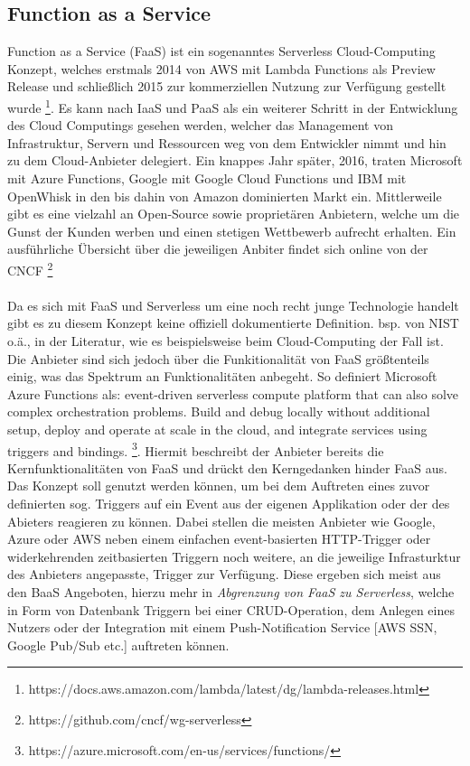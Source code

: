 \documentclass[11pt]{article}
\begin{document}
\subsection{Function as a Service}
Function as a Service (FaaS) ist ein sogenanntes \glqq Serverless\grqq{} Cloud-Computing Konzept, welches erstmals 2014 von AWS mit Lambda Functions als Preview Release und schließlich 2015 zur kommerziellen Nutzung zur Verfügung gestellt wurde \footnote{https://docs.aws.amazon.com/lambda/latest/dg/lambda-releases.html}. Es kann nach IaaS und PaaS als ein weiterer Schritt in der Entwicklung des Cloud Computings gesehen werden, welcher das Management von Infrastruktur, Servern und Ressourcen weg von dem Entwickler nimmt und hin zu dem Cloud-Anbieter delegiert. Ein knappes Jahr später, 2016, traten Microsoft mit Azure Functions, Google mit Google Cloud Functions und IBM mit OpenWhisk in den bis dahin von Amazon dominierten Markt ein. Mittlerweile gibt es eine vielzahl an Open-Source sowie proprietären Anbietern, welche um die Gunst der Kunden werben und einen stetigen Wettbewerb aufrecht erhalten. Ein ausführliche Übersicht über die jeweiligen Anbiter findet sich online von der CNCF \footnote{https://github.com/cncf/wg-serverless}\\\\
Da es sich mit FaaS und Serverless um eine noch recht junge Technologie handelt gibt es zu diesem Konzept keine offiziell dokumentierte Definition. bsp. von NIST o.ä., in der Literatur, wie es beispielsweise beim Cloud-Computing \cite{mell2011nist} der Fall ist. Die Anbieter sind sich jedoch über die Funkitionalität von FaaS größtenteils einig, was das Spektrum an Funktionalitäten anbegeht. So definiert Microsoft Azure Functions als: \glqq [...] event-driven serverless compute platform that can also solve complex orchestration problems. Build and debug locally without additional setup, deploy and operate at scale in the cloud, and integrate services using triggers and bindings. \grqq{} \footnote{https://azure.microsoft.com/en-us/services/functions/}. Hiermit beschreibt der Anbieter bereits die Kernfunktionalitäten von FaaS und drückt den Kerngedanken hinder FaaS aus. Das Konzept soll genutzt werden können, um bei dem Auftreten eines zuvor definierten sog. Triggers auf ein Event aus der eigenen Applikation oder der des Abieters reagieren zu können. Dabei stellen die meisten Anbieter wie Google, Azure oder AWS neben einem einfachen event-basierten HTTP-Trigger oder widerkehrenden zeitbasierten Triggern noch weitere, an die jeweilige Infrasturktur des Anbieters angepasste, Trigger zur Verfügung. Diese ergeben sich meist aus den BaaS Angeboten, hierzu mehr in \textit{Abgrenzung von FaaS zu Serverless}, welche in Form von Datenbank Triggern bei einer CRUD-Operation, dem Anlegen eines Nutzers oder der Integration mit einem Push-Notification Service [AWS SSN, Google Pub/Sub etc.] auftreten können.\\
\end{document}
